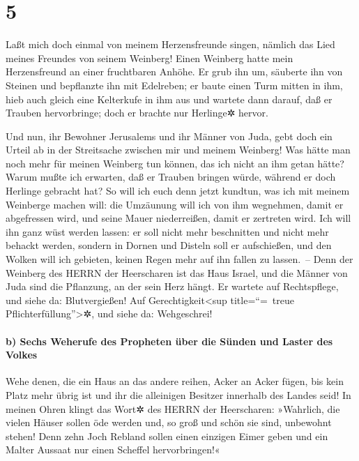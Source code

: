 \hypertarget{section-4}{%
\section{5}\label{section-4}}

Laßt mich doch einmal von meinem Herzensfreunde singen,
nämlich das Lied meines Freundes von seinem Weinberg! Einen Weinberg
hatte mein Herzensfreund an einer fruchtbaren Anhöhe. Er
grub ihn um, säuberte ihn von Steinen und bepflanzte ihn mit Edelreben;
er baute einen Turm mitten in ihm, hieb auch gleich eine Kelterkufe in
ihm aus und wartete dann darauf, daß er Trauben hervorbringe; doch er
brachte nur Herlinge✲ hervor.

Und nun, ihr Bewohner Jerusalems und ihr Männer von Juda,
gebt doch ein Urteil ab in der Streitsache zwischen mir und meinem
Weinberg! Was hätte man noch mehr für meinen Weinberg tun
können, das ich nicht an ihm getan hätte? Warum mußte ich erwarten, daß
er Trauben bringen würde, während er doch Herlinge gebracht hat?
So will ich euch denn jetzt kundtun, was ich mit meinem
Weinberge machen will: die Umzäunung will ich von ihm wegnehmen, damit
er abgefressen wird, und seine Mauer niederreißen, damit er zertreten
wird. Ich will ihn ganz wüst werden lassen: er soll nicht
mehr beschnitten und nicht mehr behackt werden, sondern in Dornen und
Disteln soll er aufschießen, und den Wolken will ich gebieten, keinen
Regen mehr auf ihn fallen zu lassen.~-- Denn der Weinberg
des HERRN der Heerscharen ist das Haus Israel, und die Männer von Juda
sind die Pflanzung, an der sein Herz hängt. Er wartete auf Rechtspflege,
und siehe da: Blutvergießen! Auf Gerechtigkeit\textless sup
title=``=~treue Pflichterfüllung''\textgreater✲, und siehe da:
Wehgeschrei!

\hypertarget{b-sechs-weherufe-des-propheten-uxfcber-die-suxfcnden-und-laster-des-volkes}{%
\paragraph{b) Sechs Weherufe des Propheten über die Sünden und Laster
des
Volkes}\label{b-sechs-weherufe-des-propheten-uxfcber-die-suxfcnden-und-laster-des-volkes}}

Wehe denen, die ein Haus an das andere reihen, Acker an
Acker fügen, bis kein Platz mehr übrig ist und ihr die alleinigen
Besitzer innerhalb des Landes seid! In meinen Ohren klingt
das Wort✲ des HERRN der Heerscharen: »Wahrlich, die vielen Häuser sollen
öde werden und, so groß und schön sie sind, unbewohnt stehen!
Denn zehn Joch Rebland sollen einen einzigen Eimer geben
und ein Malter Aussaat nur einen Scheffel hervorbringen!«

